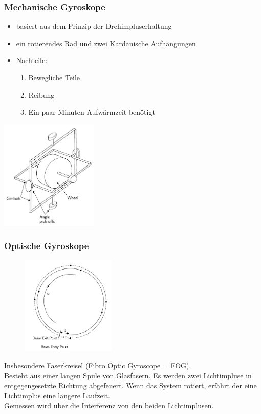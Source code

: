 \documentclass[10pt,a4paper,oneside]{beamer}
\begin{document}
\begin{frame}
	\frametitle{Mechanische Gyroskope}

	\begin{itemize}
		\item basiert aus dem Prinzip der Drehimpluserhaltung
		\item ein rotierendes Rad und zwei Kardanische Aufhängungen
		\item Nachteile:
		\begin{enumerate}
	  		\item Bewegliche Teile
	  		\item Reibung
	  		\item Ein paar Minuten Aufwärmzeit benötigt
	  	\end{enumerate}
	\end{itemize}

	\begin{center}
		\includegraphics[width=0.35\textwidth]{images/mechanical_gyroscope.png} 
	\end{center}
\end{frame}

\begin{frame}
	\frametitle{Optische Gyroskope}
	\begin{figure}
	\includegraphics[width=0.4\textwidth]{images/fog.png} 
	\end{figure}
	
	Insbesondere Faserkreisel (Fibro Optic Gyroscope = FOG). \\
	Besteht aus einer langen Spule von Glasfasern. Es werden zwei Lichtimpluse in entgegengesetzte Richtung abgefeuert. Wenn das System rotiert, erfährt der eine Lichtimplus eine längere Laufzeit.\\
	Gemessen wird über die Interferenz von den beiden Lichtimplusen.

\end{frame}
\end{document}
